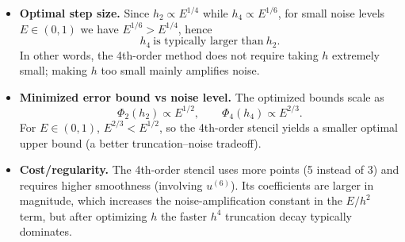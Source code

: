 \documentclass[a4paper]{article}
\begin{document}
\begin{itemize}
  \item \textbf{Optimal step size.}
  Since \(h_{2}\propto E^{1/4}\) while \(h_{4}\propto E^{1/6}\),
  for small noise levels \(E\in(0,1)\) we have \(E^{1/6}>E^{1/4}\), hence
  \[
  h_{4} \ \text{is typically larger than}\ h_{2}.
  \]
  In other words, the 4th-order method does not require taking \(h\) extremely small;
  making \(h\) too small mainly amplifies noise.

  \item \textbf{Minimized error bound vs noise level.}
  The optimized bounds scale as
  \[
  \Phi_2(h_{2})\propto E^{1/2},
  \qquad
  \Phi_4(h_{4})\propto E^{2/3}.
  \]
  For \(E\in(0,1)\), \(E^{2/3}<E^{1/2}\), so the 4th-order stencil yields
  a smaller optimal upper bound (a better truncation--noise tradeoff).

  \item \textbf{Cost/regularity.}
  The 4th-order stencil uses more points (5 instead of 3) and requires higher smoothness
  (involving \(u^{(6)}\)). Its coefficients are larger in magnitude, which increases the
  noise-amplification constant in the \(E/h^2\) term, but after optimizing \(h\) the faster
  \(h^4\) truncation decay typically dominates.
\end{itemize}
\end{document}

